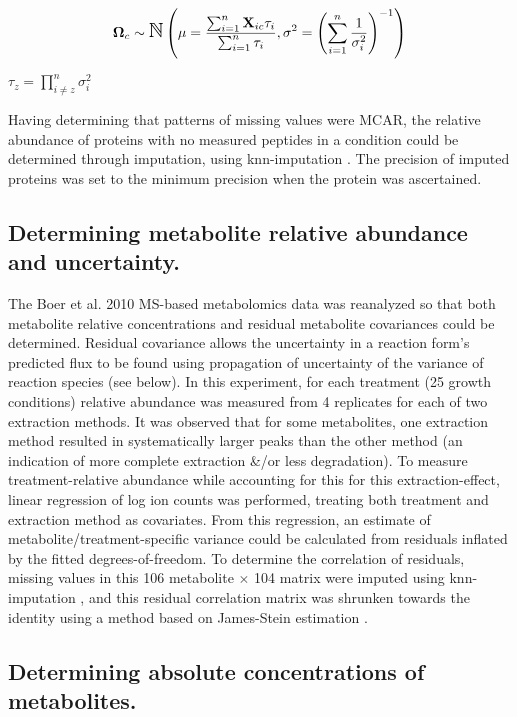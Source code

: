 \documentclass[12pt]{nature}\usepackage{graphicx, color}
\begin{document}
\begin{align}
\boldsymbol{\Omega}_{c} \sim \mbox{\Large $\mathbb{N}$}\left(\mu = \frac{\sum_{i = 1}^{n}\textbf{X}_{ic}\tau_{i}}{\sum_{i = 1}^{n}\tau_{i}}, \sigma^{2} =  \left(\sum_{i = 1}^{n}\frac{1}{\sigma^{2}_{i}}\right)^{-1} \right)\label{GIL}
\end{align}

$\tau_{z} = \prod_{i \neq z}^{n}\sigma^{2}_{i}$

Having determining that patterns of missing values were MCAR, the relative abundance of proteins with no measured peptides in a condition could be determined through imputation, using knn-imputation \cite{Troyanskaya:2001uh}.  The precision of imputed proteins was set to the minimum precision when the protein was ascertained.

\subsection{Determining metabolite relative abundance and uncertainty.}

The Boer et al. 2010 MS-based metabolomics data \cite{main-Boer:2010fb} was reanalyzed so that both metabolite relative concentrations and residual metabolite covariances could be determined.  Residual covariance allows the uncertainty in a reaction form's predicted flux to be found using propagation of uncertainty of the variance of reaction species (see below).  In this experiment, for each treatment (25 growth conditions) relative abundance was measured from 4 replicates for each of two extraction methods.  It was observed that for some metabolites, one extraction method resulted in systematically larger peaks than the other method (an indication of more complete extraction \&/or less degradation).  To measure treatment-relative abundance while accounting for this for this extraction-effect, linear regression of log ion counts was performed, treating both treatment and extraction method as covariates.  From this regression, an estimate of metabolite/treatment-specific variance could be calculated from residuals inflated by the fitted degrees-of-freedom.  To determine the correlation of residuals, missing values in this 106 metabolite $\times$ 104 matrix were imputed using knn-imputation \cite{Troyanskaya:2001uh}, and this residual correlation matrix was shrunken towards the identity using a method based on James-Stein estimation \cite{Schaefer:2010tv}.

\subsection{Determining absolute concentrations of metabolites.}
\end{document}
